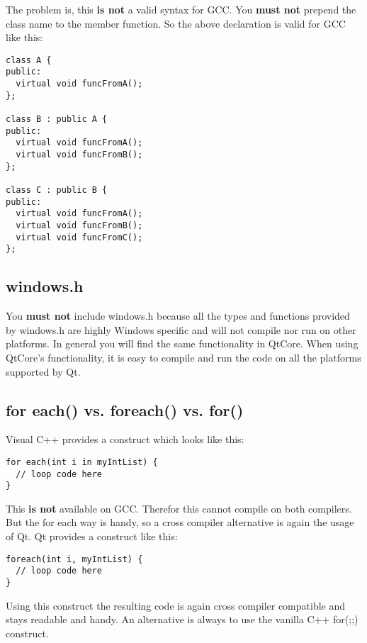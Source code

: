 The problem is, this \textbf{is not} a valid syntax for GCC. You \textbf{must not} prepend the class name to the member function. So the above declaration is valid for GCC like this:
\begin{verbatim}
class A {
public:
  virtual void funcFromA();
};

class B : public A {
public:
  virtual void funcFromA();
  virtual void funcFromB();
};

class C : public B {
public:
  virtual void funcFromA();
  virtual void funcFromB();
  virtual void funcFromC();
};
\end{verbatim}

\subsection{windows.h} You \textbf{must not} include windows.h because all the types and functions provided by windows.h are highly Windows specific and will not compile nor run on other platforms. In general you will find the same functionality in QtCore. When using QtCore's functionality, it is easy to compile and run the code on all the platforms supported by Qt.

\subsection{for each() vs. foreach() vs. for()} Visual C++ provides a construct which looks like this:
\begin{verbatim}
for each(int i in myIntList) {
  // loop code here
}
\end{verbatim}
This \textbf{is not} available on GCC. Therefor this cannot compile on both compilers. But the for each way is handy, so a cross compiler alternative is again the usage of Qt. Qt provides a construct like this:
\begin{verbatim}
foreach(int i, myIntList) {
  // loop code here
}
\end{verbatim}
Using this construct the resulting code is again cross compiler compatible and stays readable and handy. An alternative is always to use the vanilla C++ for(;;) construct. 

